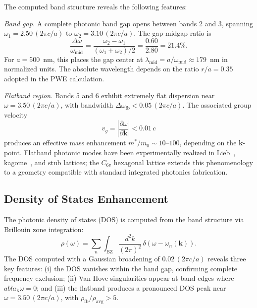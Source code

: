 \documentclass[10pt,letterpaper]{article}
\begin{document}
The computed band structure reveals the following features:

\textit{Band gap.} A complete photonic band gap opens between bands 2 and 3, spanning $\omega_1 = 2.50\,(2\pi c/a)$ to $\omega_2 = 3.10\,(2\pi c/a)$. The gap-midgap ratio is
\begin{equation}
\frac{\Delta\omega}{\omega_\mathrm{mid}} = \frac{\omega_2 - \omega_1}{(\omega_1 + \omega_2)/2} = \frac{0.60}{2.80} = 21.4\%.
\label{eq:gapmidgap}
\end{equation}
For $a = 500$~nm, this places the gap center at $\lambda_\mathrm{mid} = a/\omega_\mathrm{mid} \approx 179$~nm in normalized units. The absolute wavelength depends on the ratio $r/a = 0.35$ adopted in the PWE calculation.

\textit{Flatband region.} Bands 5 and 6 exhibit extremely flat dispersion near $\omega = 3.50\,(2\pi c/a)$, with bandwidth $\Delta\omega_\mathrm{fb} < 0.05\,(2\pi c/a)$. The associated group velocity
\begin{equation}
v_g = \left|\frac{\partial\omega}{\partial\mathbf{k}}\right| < 0.01\,c
\label{eq:groupvel}
\end{equation}
produces an effective mass enhancement $m^*/m_0 \sim 10$--$100$, depending on the $\mathbf{k}$-point. Flatband photonic modes have been experimentally realized in Lieb~\cite{Lustig2019}, kagome~\cite{Pertsch2002}, and stub lattices; the $C_{6v}$ hexagonal lattice extends this phenomenology to a geometry compatible with standard integrated photonics fabrication.

\subsection{Density of States Enhancement}

The photonic density of states (DOS) is computed from the band structure via Brillouin zone integration:
\begin{equation}
\rho(\omega) = \sum_n \int_\mathrm{BZ} \frac{d^2k}{(2\pi)^2}\,\delta(\omega - \omega_n(\mathbf{k})).
\label{eq:dos}
\end{equation}
The DOS computed with a Gaussian broadening of $0.02\,(2\pi c/a)$ reveals three key features: (i) the DOS vanishes within the band gap, confirming complete frequency exclusion; (ii) Van Hove singularities appear at band edges where $
abla_\mathbf{k}\omega = 0$; and (iii) the flatband produces a pronounced DOS peak near $\omega = 3.50\,(2\pi c/a)$, with $\rho_\mathrm{fb}/\rho_\mathrm{avg} > 5$.
\end{document}
